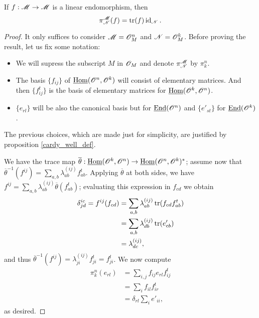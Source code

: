 \begin{lemma}
If $f:\mathscr{M}\to \mathscr{M}$ is a linear endomorphism, then
$$\pi^{\mathscr{M}}_{\mathscr{N}}(f)=\operatorname{tr}(f)\operatorname{id}_{\mathscr{N}}.$$
\end{lemma}
\begin{proof}
It only suffices to consider $\mathscr{M}=\mathscr{O}^n_M$ and $\mathscr{N}=\mathscr{O}^k_M$. Before proving the result, let us fix some notation:
\begin{itemize}
\item We will supress the subscript $M$ in $\mathscr{O}_M$ and denote $\pi^{\mathscr{M}}_{\mathscr{N}}$ by $\pi^n_k$.
\item The basis $\{f_{ij}\}$ of $\underline{\operatorname{Hom}}(\mathscr{O}^n,\mathscr{O}^k)$ will consist of elementary matrices. And then $\{f_{ij}^t\}$ is the basis of elementary matrices for $\underline{\operatorname{Hom}}(\mathscr{O}^k,\mathscr{O}^n)$.
\item $\{e_{rl}\}$ will be also the canonical basis but for $\underline{\operatorname{End}}(\mathscr{O}^n)$ and $\{e'_{st}\}$ for $\underline{\operatorname{End}}(\mathscr{O}^k)$.
\end{itemize}
The previous choices, which are made just for simplicity, are justified by proposition \ref{cardy_well_def}.

We have the trace map $\overline{\theta}:\underline{\operatorname{Hom}}(\mathscr{O}^k,\mathscr{O}^n)\to \underline{\operatorname{Hom}}(\mathscr{O}^n,\mathscr{O}^k)^*$; assume now that $\overline{\theta}^{-1}(f^{ij})=\sum_{a,b} \lambda^{(ij)}_{ab}f^t_{ab}$. Applying $\overline{\theta}$ at both sides, we have $f^{ij}=\sum_{a,b} \lambda^{(ij)}_{ab}\overline{\theta}(f^t_{ab})$; evaluating this expression in $f_{cd}$ we obtain
$$
\begin{aligned}
\delta^{ic}_{jd} =f^{ij}(f_{cd}) &= \sum_{a,b}\lambda^{(ij)}_{ab}\operatorname{tr}(f_{cd}f^t_{ab}) \\
                                 &= \sum_{a,b}\lambda^{(ij)}_{db}\operatorname{tr}(e'_{cb}) \\
                                 &= \lambda^{(ij)}_{dc}, \\
\end{aligned}
$$
and thus $\overline{\theta}^{-1}(f^{ij})=\lambda^{(ij)}_{ji}f^t_{ji}=f^t_{ji}$. We now compute
$$
\begin{aligned}
\pi^n_k(e_{rl}) &= \sum_{i,j}f_{ij}e_{rl}f_{ij}^t \\
                &= \sum_if_{il}f^t_{ir} \\
                &= \delta_{rl}\sum_ie'_{ii},
\end{aligned}
$$
as desired.
\end{proof}

